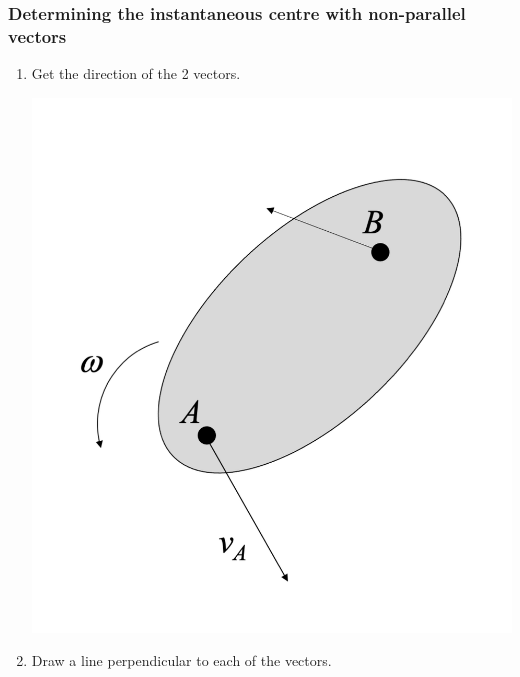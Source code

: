 \documentclass[11pt]{article}
\begin{document}
\subsubsection{Determining the instantaneous centre with non-parallel vectors}
\label{sec:org4b4be6c}
\begin{enumerate}
\item Get the direction of the 2 vectors.
\begin{center}
\includegraphics[scale=0.4]{./images/instantaneous-centre-non-parallel-vectors-first-step.png}
\end{center}
\item Draw a line perpendicular to each of the vectors.
\begin{center}

\end{center}
\end{enumerate}
\end{document}
